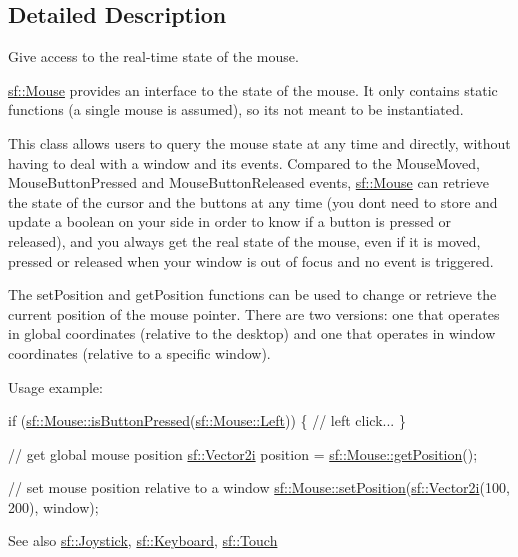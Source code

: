 \subsection{Detailed Description}
Give access to the real-\/time state of the mouse. 

\hyperlink{classsf_1_1_mouse}{sf\+::\+Mouse} provides an interface to the state of the mouse. It only contains static functions (a single mouse is assumed), so it\textquotesingle{}s not meant to be instantiated.

This class allows users to query the mouse state at any time and directly, without having to deal with a window and its events. Compared to the Mouse\+Moved, Mouse\+Button\+Pressed and Mouse\+Button\+Released events, \hyperlink{classsf_1_1_mouse}{sf\+::\+Mouse} can retrieve the state of the cursor and the buttons at any time (you don\textquotesingle{}t need to store and update a boolean on your side in order to know if a button is pressed or released), and you always get the real state of the mouse, even if it is moved, pressed or released when your window is out of focus and no event is triggered.

The set\+Position and get\+Position functions can be used to change or retrieve the current position of the mouse pointer. There are two versions\+: one that operates in global coordinates (relative to the desktop) and one that operates in window coordinates (relative to a specific window).

Usage example\+: 
\begin{DoxyCode}
\textcolor{keywordflow}{if} (\hyperlink{classsf_1_1_mouse_ab647159eb88e369a0332a9c5a7ba6687}{sf::Mouse::isButtonPressed}(\hyperlink{classsf_1_1_mouse_a4fb128be433f9aafe66bc0c605daaa90a8bb4856e1ec7f6b6a8605effdfc0eee8}{sf::Mouse::Left}))
\{
    \textcolor{comment}{// left click...}
\}

\textcolor{comment}{// get global mouse position}
\hyperlink{classsf_1_1_vector2}{sf::Vector2i} position = \hyperlink{classsf_1_1_mouse_ac368680f797b7f6e4f50b5b7928c1387}{sf::Mouse::getPosition}();

\textcolor{comment}{// set mouse position relative to a window}
\hyperlink{classsf_1_1_mouse_a1222e16c583be9e3d176d86e0b7817d7}{sf::Mouse::setPosition}(\hyperlink{classsf_1_1_vector2}{sf::Vector2i}(100, 200), window);
\end{DoxyCode}


\begin{DoxySeeAlso}{See also}
\hyperlink{classsf_1_1_joystick}{sf\+::\+Joystick}, \hyperlink{classsf_1_1_keyboard}{sf\+::\+Keyboard}, \hyperlink{classsf_1_1_touch}{sf\+::\+Touch} 
\end{DoxySeeAlso}


